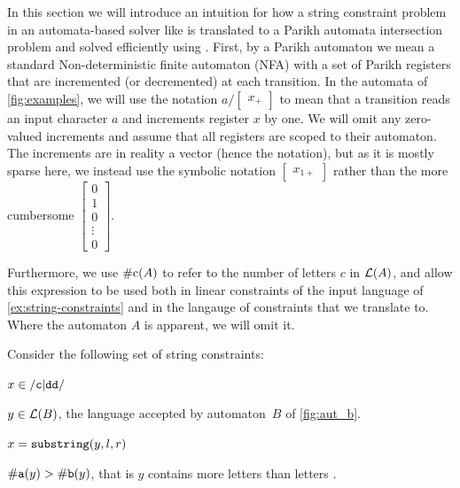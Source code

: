 In this section we will introduce an intuition for how a string constraint problem in an automata-based solver like \OstrichPlus{} is translated to a Parikh automata intersection problem and solved efficiently using \Calculus{}. First, by a Parikh automaton we mean a standard Non-deterministic finite automaton (NFA) with a set of Parikh registers that are incremented (or decremented) at each transition. In the automata of \cref{fig:examples}, we will use the notation $a / \begin{bmatrix} x_+ \end{bmatrix}$ to mean that a transition reads an input character $a$ and increments register $x$ by one. We will omit any zero-valued increments and assume that all registers are scoped to their automaton. The increments are in reality a vector (hence the notation), but as it is mostly sparse here, we instead use the symbolic notation $\begin{bmatrix} x_{1+} \end{bmatrix}$ rather than the more cumbersome $\begin{bmatrix} 0 \\ 1 \\ 0 \\  \vdots \\ 0 \end{bmatrix}$.

Furthermore, we use $\#\text{c}(A)$ to refer to the number of letters $c$ in $\operatorname{\mathcal{L}}(A)$, and allow this expression to be used both in linear constraints of the input language of \cref{ex:string-constraints} and in the langauge of constraints that we translate to. Where the automaton $A$ is apparent, we will omit it.

\begin{example}\label{ex:string-constraints}
    Consider the following set of string constraints:
\begin{constraints}
    \item\label{const:x-in-c-dd} $x \in \mathtt{\slash c\vert{}dd\slash}$
    \item\label{const:y-in-b} $y \in \operatorname{\mathcal{L}}(B)$, the language accepted by automaton~$B$ of \cref{fig:aut_b}.
    \item\label{const:x-substring} $x = \operatorname{\mathtt{substring}}(y, l, r)$
    \item\label{const:more-a-than-b} $\#\text{\texttt{a}}(y) > \#\text{\texttt{b}}(y)$, that is $y$ contains more letters  than letters .
\end{constraints}
\end{example}

